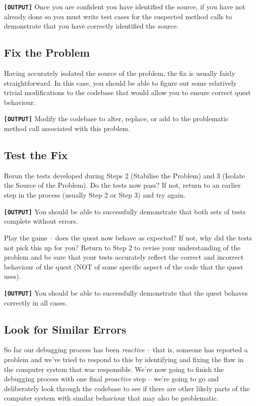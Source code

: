 \documentclass[
]{book}
\begin{document}
\textbf{\texttt{{[}OUTPUT{]}}} Once you are confident you have identified the source, if you have not already done so you must write test cases for the suspected method calls to demonstrate that you have correctly identified the source.

\hypertarget{fixit}{%
\subsection{Fix the Problem}\label{fixit}}

Having accurately isolated the source of the problem, the fix is usually fairly straightforward. In this case, you should be able to figure out some relatively trivial modifications to the codebase that would allow you to ensure correct quest behaviour.

\textbf{\texttt{{[}OUTPUT{]}}} Modify the codebase to alter, replace, or add to the problematic method call associated with this problem.

\hypertarget{testfix}{%
\subsection{Test the Fix}\label{testfix}}

Rerun the tests developed during Steps 2 (Stabilise the Problem) and 3 (Isolate the Source of the Problem). Do the tests now pass? If not, return to an earlier step in the process (usually Step 2 or Step 3) and try again.

\textbf{\texttt{{[}OUTPUT{]}}} You should be able to successfully demonstrate that both sets of tests complete without errors.

Play the game -- does the quest now behave as expected? If not, why did the tests not pick this up for you? Return to Step 2 to revise your understanding of the problem and be sure that your tests accurately reflect the correct and incorrect behaviour of the quest (NOT of some specific aspect of the code that the quest uses).

\textbf{\texttt{{[}OUTPUT{]}}} You should be able to successfully demonstrate that the quest behaves correctly in all cases.

\hypertarget{similarity}{%
\subsection{Look for Similar Errors}\label{similarity}}

So far our debugging process has been \emph{reactive} -- that is, someone has reported a problem and we've tried to respond to this by identifying and fixing the flaw in the computer system that was responsible. We're now going to finish the debugging process with one final \emph{proactive} step -- we're going to go and deliberately look through the codebase to see if there are other likely parts of the computer system with similar behaviour that may also be problematic.
\end{document}
